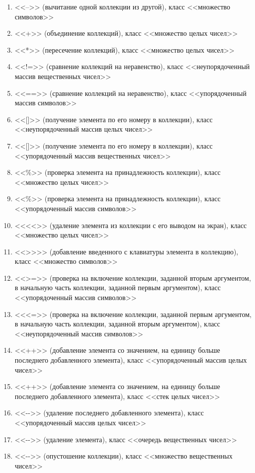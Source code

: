 \begin{enumerate}
\item <<–>> (вычитание одной коллекции из другой), класс <<множество символов>>
\item <<+>> (объединение коллекций), класс <<множество целых чисел>>
\item <<*>> (пересечение коллекций), класс <<множество целых чисел>>
\item <<!=>> (сравнение коллекций на неравенство), класс <<неупорядоченный массив вещественных чисел>>
\item <<==>> (сравнение коллекций на неравенство), класс <<упорядоченный массив символов>>
\item <<[]>> (получение элемента по его номеру в коллекции), класс <<неупорядоченный массив целых чисел>>
\item <<[]>> (получение элемента по его номеру в коллекции), класс <<упорядоченный массив вещественных чисел>>
\item <<\%>> (проверка элемента на принадлежность коллекции), класс <<множество целых чисел>>
\item <<\%>> (проверка элемента на принадлежность коллекции), класс <<упорядоченный массив символов>>
\item <<{<}{<}>> (удаление элемента из коллекции с его выводом на экран), класс <<множество целых чисел>>
\item <<{>}{>}>>  (добавление введенного с клавиатуры элемента в коллекцию), класс <<множество
символов>>
\item <<{>}=>> (проверка на включение коллекции, заданной вторым аргументом, в начальную часть коллекции,
заданной первым аргументом), класс <<упорядоченный массив символов>>
\item <<{<}=>> (проверка на включение коллекции, заданной первым аргументом, в начальную часть коллекции, заданной
вторым аргументом), класс <<неупорядоченный массив символов>>
\item <<++>> (добавление элемента со значением, на единицу больше последнего добавленного элемента), класс <<упорядоченный
массив целых чисел>>
\item <<++>> (добавление элемента со значением, на единицу больше последнего добавленного элемента), класс <<стек целых
чисел>>
\item <<-{}->> (удаление последнего добавленного элемента), класс <<упорядоченный массив целых чисел>>
\item <<-{}->> (удаление элемента), класс <<очередь вещественных чисел>>
\item <<-{}->> (опустошение коллекции), класс <<множество вещественных чисел>>

\end{enumerate}
